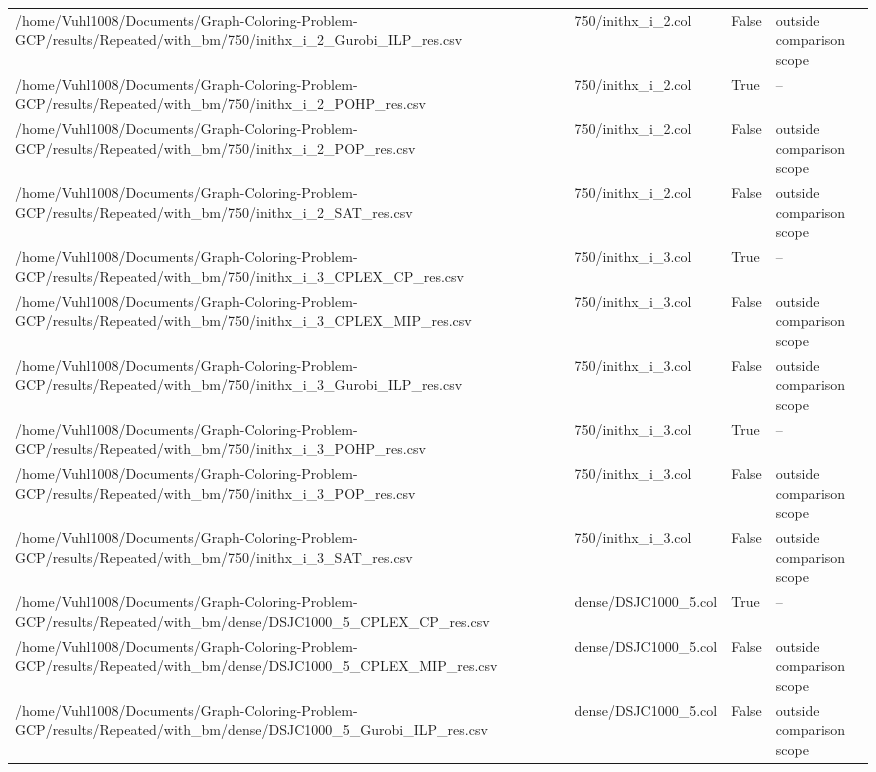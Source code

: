 \begin{table}[htbp]
\begin{tabular}{llll}
/home/Vuhl1008/Documents/Graph-Coloring-Problem-GCP/results/Repeated/with\_bm/750/inithx\_i\_2\_Gurobi\_ILP\_res.csv & 750/inithx\_i\_2.col & False & outside comparison scope \\
/home/Vuhl1008/Documents/Graph-Coloring-Problem-GCP/results/Repeated/with\_bm/750/inithx\_i\_2\_POHP\_res.csv & 750/inithx\_i\_2.col & True & -- \\
/home/Vuhl1008/Documents/Graph-Coloring-Problem-GCP/results/Repeated/with\_bm/750/inithx\_i\_2\_POP\_res.csv & 750/inithx\_i\_2.col & False & outside comparison scope \\
/home/Vuhl1008/Documents/Graph-Coloring-Problem-GCP/results/Repeated/with\_bm/750/inithx\_i\_2\_SAT\_res.csv & 750/inithx\_i\_2.col & False & outside comparison scope \\
/home/Vuhl1008/Documents/Graph-Coloring-Problem-GCP/results/Repeated/with\_bm/750/inithx\_i\_3\_CPLEX\_CP\_res.csv & 750/inithx\_i\_3.col & True & -- \\
/home/Vuhl1008/Documents/Graph-Coloring-Problem-GCP/results/Repeated/with\_bm/750/inithx\_i\_3\_CPLEX\_MIP\_res.csv & 750/inithx\_i\_3.col & False & outside comparison scope \\
/home/Vuhl1008/Documents/Graph-Coloring-Problem-GCP/results/Repeated/with\_bm/750/inithx\_i\_3\_Gurobi\_ILP\_res.csv & 750/inithx\_i\_3.col & False & outside comparison scope \\
/home/Vuhl1008/Documents/Graph-Coloring-Problem-GCP/results/Repeated/with\_bm/750/inithx\_i\_3\_POHP\_res.csv & 750/inithx\_i\_3.col & True & -- \\
/home/Vuhl1008/Documents/Graph-Coloring-Problem-GCP/results/Repeated/with\_bm/750/inithx\_i\_3\_POP\_res.csv & 750/inithx\_i\_3.col & False & outside comparison scope \\
/home/Vuhl1008/Documents/Graph-Coloring-Problem-GCP/results/Repeated/with\_bm/750/inithx\_i\_3\_SAT\_res.csv & 750/inithx\_i\_3.col & False & outside comparison scope \\
/home/Vuhl1008/Documents/Graph-Coloring-Problem-GCP/results/Repeated/with\_bm/dense/DSJC1000\_5\_CPLEX\_CP\_res.csv & dense/DSJC1000\_5.col & True & -- \\
/home/Vuhl1008/Documents/Graph-Coloring-Problem-GCP/results/Repeated/with\_bm/dense/DSJC1000\_5\_CPLEX\_MIP\_res.csv & dense/DSJC1000\_5.col & False & outside comparison scope \\
/home/Vuhl1008/Documents/Graph-Coloring-Problem-GCP/results/Repeated/with\_bm/dense/DSJC1000\_5\_Gurobi\_ILP\_res.csv & dense/DSJC1000\_5.col & False & outside comparison scope \\

\end{tabular}
\end{table}
